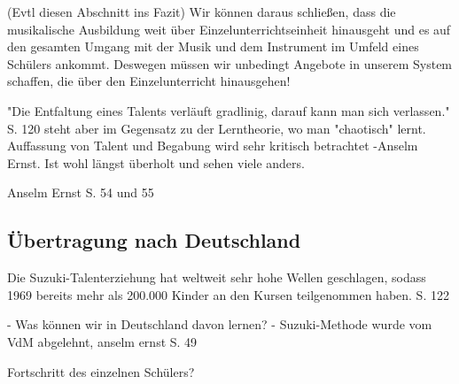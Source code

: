 (Evtl diesen Abschnitt ins Fazit) Wir können daraus schließen, dass die
musikalische Ausbildung weit über Einzelunterrichtseinheit hinausgeht und es auf
den gesamten Umgang mit der Musik und dem Instrument im Umfeld eines Schülers
ankommt. Deswegen müssen wir unbedingt Angebote in unserem System schaffen, die
über den Einzelunterricht hinausgehen! 



"Die Entfaltung eines Talents verläuft gradlinig, darauf kann man sich
verlassen." S. 120 \autocite[120]{suzuki:erziehung_ist_liebe} steht aber im
Gegensatz zu der Lerntheorie, wo man "chaotisch" lernt. Auffassung von Talent
und Begabung wird sehr kritisch betrachtet -Anselm Ernst. Ist wohl längst
überholt und sehen viele anders.



Anselm Ernst S. 54 und 55


\subsection{Übertragung nach Deutschland}

Die Suzuki-Talenterziehung hat weltweit sehr hohe Wellen geschlagen, sodass 1969
bereits mehr als 200.000 Kinder an den Kursen teilgenommen haben. S. 122

- Was können wir in Deutschland davon lernen? - Suzuki-Methode wurde vom VdM
abgelehnt, anselm ernst S. 49


Fortschritt des einzelnen Schülers?
